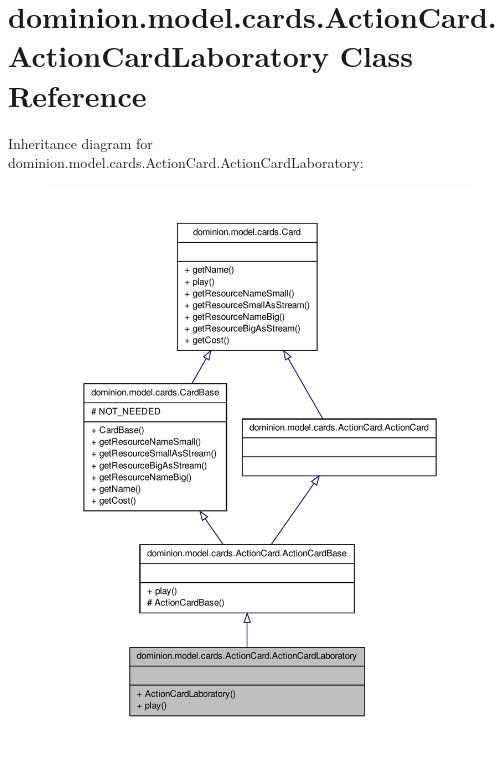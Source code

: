 \hypertarget{classdominion_1_1model_1_1cards_1_1ActionCard_1_1ActionCardLaboratory}{\section{dominion.\-model.\-cards.\-Action\-Card.\-Action\-Card\-Laboratory \-Class \-Reference}
\label{classdominion_1_1model_1_1cards_1_1ActionCard_1_1ActionCardLaboratory}
}


\-Inheritance diagram for dominion.\-model.\-cards.\-Action\-Card.\-Action\-Card\-Laboratory\-:
\nopagebreak
\begin{figure}[H]
\begin{center}
\leavevmode
\includegraphics[width=350pt]{classdominion_1_1model_1_1cards_1_1ActionCard_1_1ActionCardLaboratory__inherit__graph}
\end{center}
\end{figure}


